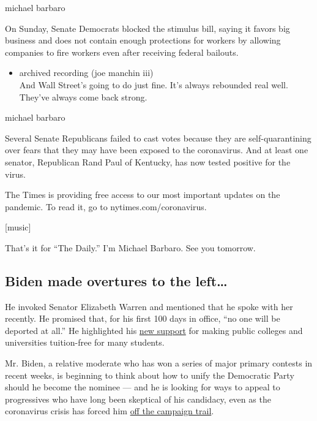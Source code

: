 michael barbaro

On Sunday, Senate Democrats blocked the stimulus bill, saying it favors
big business and does not contain enough protections for workers by
allowing companies to fire workers even after receiving federal
bailouts.

\begin{itemize}
\tightlist
\item
  archived recording (joe manchin iii)\\
  And Wall Street's going to do just fine. It's always rebounded real
  well. They've always come back strong.
\end{itemize}

michael barbaro

Several Senate Republicans failed to cast votes because they are
self-quarantining over fears that they may have been exposed to the
coronavirus. And at least one senator, Republican Rand Paul of Kentucky,
has now tested positive for the virus.

The Times is providing free access to our most important updates on the
pandemic. To read it, go to nytimes.com/coronavirus.

{[}music{]}

That's it for ``The Daily.'' I'm Michael Barbaro. See you tomorrow.

\hypertarget{biden-made-overtures-to-the-left}{%
\subsection{Biden made overtures to the
left\ldots{}}\label{biden-made-overtures-to-the-left}}

He invoked Senator Elizabeth Warren and mentioned that he spoke with her
recently. He promised that, for his first 100 days in office, ``no one
will be deported at all.'' He highlighted his
\href{https://www.nytimes.com/2020/03/15/us/politics/biden-backs-free-college.html}{new
support} for making public colleges and universities tuition-free for
many students.

Mr. Biden, a relative moderate who has won a series of major primary
contests in recent weeks, is beginning to think about how to unify the
Democratic Party should he become the nominee --- and he is looking for
ways to appeal to progressives who have long been skeptical of his
candidacy, even as the coronavirus crisis has forced him
\href{https://www.nytimes.com/2020/03/13/us/politics/joe-biden-digital-campaign.html}{off
the campaign trail}.

